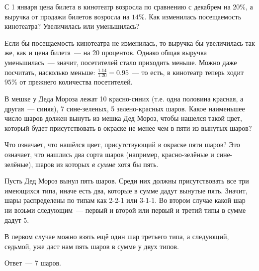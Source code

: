 \begin{itemize}
\itB С 1 января цена билета в кинотеатр возросла по сравнению с декабрем на $20 \%$, а выручка от продажи билетов возросла на $14 \%$. Как изменилась посещаемость кинотеатра? Увеличилась или уменьшилась?

\itr Если бы посещаемость кинотеатра не изменилась, то выручка бы увеличилась так же, как и цена билета~— на 20 процентов. Однако общая выручка уменьшилась~— значит, посетителей стало приходить меньше. Можно даже посчитать, насколько меньше: $\tfrac{1.14}{1.20} = 0.95$~— то есть, в кинотеатр теперь ходит $95 \%$ от прежнего количества посетителей.

\itC В мешке у Деда Мороза лежат 10 красно-синих (т.е. одна половина красная, а другая~— синяя), 7 сине-зеленых, 5 зелено-красных шаров. Какое наименьшее число шаров должен вынуть из мешка Дед Мороз, чтобы нашелся такой цвет, который будет присутствовать в окраске не менее чем в пяти из вынутых шаров?

\itr Что означает, что нашёлся цвет, присутствующий в окраске пяти шаров? Это означает, что нашлись два сорта шаров (например, красно-зелёные и сине-зелёные), шаров из которых {\it в сумме} хотя бы пять.

Пусть Дед Мороз вынул пять шаров. Среди них должны присутствовать все три имеющихся типа, иначе есть два, которые в сумме дадут вынутые пять. Значит, шары распределены по типам как 2-2-1 или 3-1-1. Во втором случае какой шар ни возьми следующим~— первый и второй или первый и третий типы в сумме дадут 5.

В первом случае можно взять ещё один шар третьего типа, а следующий, седьмой, уже даст нам пять шаров в сумме у двух типов.

Ответ~— 7 шаров.
\bigbreak\noindent

\end{itemize}


